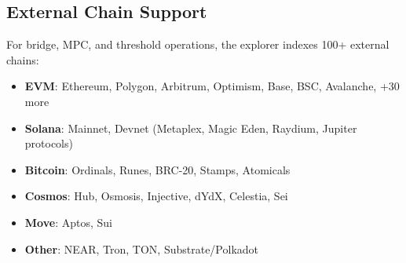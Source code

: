 \subsection{External Chain Support}

For bridge, MPC, and threshold operations, the explorer indexes 100+ external chains:

\begin{itemize}
  \item \textbf{EVM}: Ethereum, Polygon, Arbitrum, Optimism, Base, BSC, Avalanche, +30 more
  \item \textbf{Solana}: Mainnet, Devnet (Metaplex, Magic Eden, Raydium, Jupiter protocols)
  \item \textbf{Bitcoin}: Ordinals, Runes, BRC-20, Stamps, Atomicals
  \item \textbf{Cosmos}: Hub, Osmosis, Injective, dYdX, Celestia, Sei
  \item \textbf{Move}: Aptos, Sui
  \item \textbf{Other}: NEAR, Tron, TON, Substrate/Polkadot
\end{itemize}

